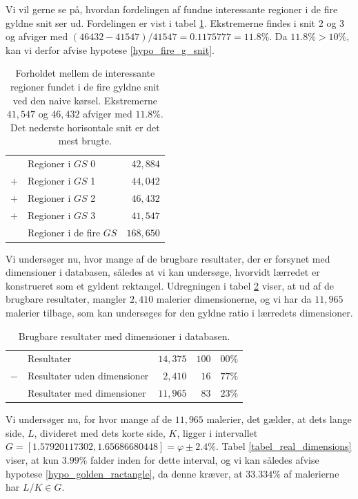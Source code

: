 {Vi vil gerne se på, hvordan fordelingen af fundne interessante regioner
i de fire gyldne snit ser ud. Fordelingen er vist i tabel
\ref{tabel_fire_snit}. Ekstremerne findes i snit 2 og 3 og afviger med
$(46432-41547)/41547 = 0.1175777 = 11.8 \%$. Da $11.8 \% > 10 \%$,
kan vi derfor afvise hypotese \ref{hypo_fire_g_snit}.

\begin{table}[H]
    \centering
    \begin{tabular}{r@{\ \ }p{12em}r}
            & Regioner i $GS$ 0             &  $42,884$ \\
        $+$ & Regioner i $GS$ 1             &  $44,042$ \\
        $+$ & Regioner i $GS$ 2             &  $46,432$ \\
        $+$ & Regioner i $GS$ 3             &  $41,547$ \\\hline
            & Regioner i de fire $GS$       & $168,650$
    \end{tabular}
    \caption[]{Forholdet mellem de interessante regioner fundet i de
    fire gyldne snit ved den naive kørsel. Ekstremerne $41,547$ og
    $46,432$ afviger med $11.8 \%$. Det nederste horisontale snit er det
    mest brugte.}
    \label{tabel_fire_snit}
\end{table}

Vi undersøger nu, hvor mange af de brugbare resultater, der er forsynet
med dimensioner i databasen, således at vi kan undersøge, hvorvidt
lærredet er konstrueret som et gyldent rektangel. Udregningen i tabel
\ref{tabel_med_dimensioner} viser, at ud af de brugbare resultater,
mangler $2,410$ malerier dimensionerne, og vi har da $11,965$ malerier
tilbage, som kan undersøges for den gyldne ratio i lærredets
dimensioner.

\begin{table}[H]
    \centering
    \begin{tabular}{r@{\ \ }p{14em}r|r@{.}l}
            & Resultater                     & $14,375$ & $100$ & $00\%$ \\
        $-$ & Resultater uden dimensioner    &  $2,410$ &  $16$ & $77\%$ \\\hline
            & Resultater med dimensioner     & $11,965$ &  $83$ & $23\%$
    \end{tabular}
    \caption[]{Brugbare resultater med dimensioner i databasen.}
    \label{tabel_med_dimensioner}
\end{table}

Vi undersøger nu, for hvor mange af de $11,965$ malerier, det gælder, at
dets lange side, $L$, divideret med dets korte side, $K$, ligger i
intervallet $G = [1.57920117302, 1.65686680448] = \varphi \pm 2.4\%$.
Tabel \ref{tabel_real_dimensions} viser, at kun $3.99\%$ falder inden
for dette interval, og vi kan således afvise hypotese
\ref{hypo_golden_ractangle}, da denne kræver, at $33.334 \%$ af
malerierne har $L/K \in G$.

}

